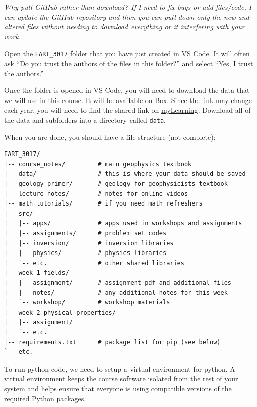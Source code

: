 \documentclass[final,a4paper,12pt]{article}
\begin{document}
\textit{Why pull GitHub rather than download? If I need to fix bugs or add files/code, I can update the GitHub repository and then you can pull down only the new and altered files without needing to download everything or it interfering with your work.}

Open the \verb+EART_3017+ folder that you have just created in VS Code.  It will often ask ``Do you trust the authors of the files in this folder?'' and select ``Yes, I trust the authors.''

Once the folder is opened in VS Code, you will need to download the data that we will use in this course.  It will be available on Box.  Since the link may change each year, you will need to find the shared link on \href{https://learn.adelaide.edu.au}{myLearning}.  Download all of the data and subfolders into a directory called \verb+data+.

When you are done, you should have a file structure (not complete):

\begin{verbatim}
EART_3017/
|-- course_notes/         # main geophysics textbook
|-- data/                 # this is where your data should be saved
|-- geology_primer/       # geology for geophysicists textbook
|-- lecture_notes/        # notes for online videos
|-- math_tutorials/       # if you need math refreshers
|-- src/
|   |-- apps/             # apps used in workshops and assignments
|   |-- assignments/      # problem set codes
|   |-- inversion/        # inversion libraries
|   |-- physics/          # physics libraries
|   `-- etc.              # other shared libraries
|-- week_1_fields/
|   |-- assignment/       # assignment pdf and additional files
|   |-- notes/            # any additional notes for this week
|   `-- workshop/         # workshop materials
|-- week_2_physical_properties/
|   |-- assignment/
|   `-- etc.
|-- requirements.txt      # package list for pip (see below)
`-- etc.
\end{verbatim}

To run python code, we need to setup a virtual environment for python. A virtual environment keeps the course software isolated from the rest of your system and helps ensure that everyone is using compatible versions of the required Python packages. 
\end{document}
